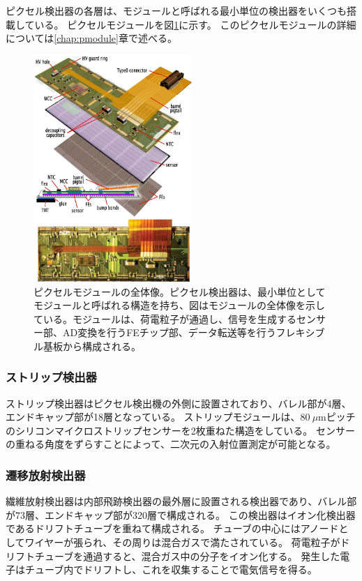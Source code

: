 ピクセル検出器の各層は、モジュールと呼ばれる最小単位の検出器をいくつも搭載している。
ピクセルモジュールを図\ref{pixel_detector}に示す。
このピクセルモジュールの詳細については\ref{chap:pmodule}章で述べる。
\begin{figure}[bpt]\centering
\includegraphics[width=6cm]{./pixel_detector.png}
\caption[ピクセルモジュールの全体像]{ピクセルモジュールの全体像\cite{1-2}。ピクセル検出器は、最小単位としてモジュールと呼ばれる構造を持ち、図はモジュールの全体像を示している。モジュールは、荷電粒子が通過し、信号を生成するセンサー部、AD変換を行うFEチップ部、データ転送等を行うフレキシブル基板から構成される。}
\label{pixel_detector}
\end{figure}

\subsubsection{ストリップ検出器}
ストリップ検出器はピクセル検出機の外側に設置されており、バレル部が4層、エンドキャップ部が18層となっている。
ストリップモジュールは、80$~\mu$mピッチのシリコンマイクロストリップセンサーを2枚重ねた構造をしている。
センサーの重ねる角度をずらすことによって、二次元の入射位置測定が可能となる。

\subsubsection{遷移放射検出器}
繊維放射検出器は内部飛跡検出器の最外層に設置される検出器であり、バレル部が73層、エンドキャップ部が320層で構成される。
この検出器はイオン化検出器であるドリフトチューブを重ねて構成される。
チューブの中心にはアノードとしてワイヤーが張られ、その周りは混合ガスで満たされている。
荷電粒子がドリフトチューブを通過すると、混合ガス中の分子をイオン化する。
発生した電子はチューブ内でドリフトし、これを収集することで電気信号を得る。

